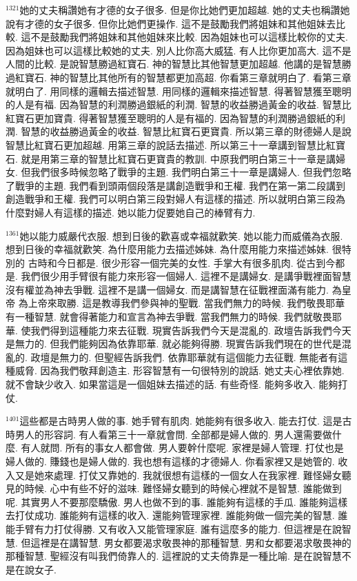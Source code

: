 \documentclass{book}
\begin{document}
$^{1321}$她的丈夫稱讚她有才德的女子很多.
但是你比她們更加超越.
她的丈夫也稱讚她說有才德的女子很多.
但你比她們更操作.
這不是鼓勵我們將姐妹和其他姐妹去比較.
這不是鼓勵我們將姐妹和其他姐妹來比較.
因為姐妹也可以這樣比較你的丈夫.
因為姐妹也可以這樣比較她的丈夫.
別人比你高大威猛.
有人比你更加高大.
這不是人間的比較.
是說智慧勝過紅寶石.
神的智慧比其他智慧更加超越.
他講的是智慧勝過紅寶石.
神的智慧比其他所有的智慧都更加高超.
你看第三章就明白了.
看第三章就明白了.
用同樣的邏輯去描述智慧.
用同樣的邏輯來描述智慧.
得著智慧獲至聰明的人是有福.
因為智慧的利潤勝過銀紙的利潤.
智慧的收益勝過黃金的收益.
智慧比紅寶石更加寶貴.
得著智慧獲至聰明的人是有福的.
因為智慧的利潤勝過銀紙的利潤.
智慧的收益勝過黃金的收益.
智慧比紅寶石更寶貴.
所以第三章的財德婦人是說智慧比紅寶石更加超越.
用第三章的說話去描述.
所以第三十一章講到智慧比紅寶石.
就是用第三章的智慧比紅寶石更寶貴的教訓.
中原我們明白第三十一章是講婦女.
但我們很多時候忽略了戰爭的主題.
我們明白第三十一章是講婦人.
但我們忽略了戰爭的主題.
我們看到頭兩個段落是講創造戰爭和王權.
我們在第一第二段講到創造戰爭和王權.
我們可以明白第三段對婦人有這樣的描述.
所以就明白第三段為什麼對婦人有這樣的描述.
她以能力促要她自己的棒臂有力.

$^{1361}$她以能力威嚴代衣服.
想到日後的歡喜或幸福就歡笑.
她以能力而威儀為衣服.
想到日後的幸福就歡笑.
為什麼用能力去描述姊妹.
為什麼用能力來描述姊妹.
很特別的 古時和今日都是.
很少形容一個完美的女性.
手掌大有很多肌肉.
從古到今都是.
我們很少用手臂很有能力來形容一個婦人.
這裡不是講婦女.
是講爭戰裡面智慧沒有權並為神去爭戰.
這裡不是講一個婦女.
而是講智慧在征戰裡面滿有能力.
為皇帝 為上帝來取勝.
這是教導我們參與神的聖戰.
當我們無力的時候.
我們敬畏耶華有一種智慧.
就會得著能力和宣言為神去爭戰.
當我們無力的時候.
我們就敬畏耶華.
使我們得到這種能力來去征戰.
現實告訴我們今天是混亂的.
政壇告訴我們今天是無力的.
但我們能夠因為依靠耶華.
就必能夠得勝.
現實告訴我們現在的世代是混亂的.
政壇是無力的.
但聖經告訴我們.
依靠耶華就有這個能力去征戰.
無能者有這種威脅.
因為我們敬拜創造主.
形容智慧有一句很特別的說話.
她丈夫心裡依靠她.
就不會缺少收入.
如果當這是一個姐妹去描述的話.
有些奇怪.
能夠多收入.
能夠打仗.

$^{1401}$這些都是古時男人做的事.
她手臂有肌肉.
她能夠有很多收入.
能去打仗.
這是古時男人的形容詞.
有人看第三十一章就會問.
全部都是婦人做的.
男人還需要做什麼.
有人就問.
所有的事女人都會做.
男人要幹什麼呢.
家裡是婦人管理.
打仗也是婦人做的.
賺錢也是婦人做的.
我也想有這樣的才德婦人.
你看家裡又是她管的.
收入又是她來處理.
打仗又靠她的.
我就很想有這樣的一個女人在我家裡.
難怪婦女聽見的時候.
心中有些不好的滋味.
難怪婦女聽到的時候心裡就不是智慧.
誰能做到呢.
其實男人不要那麼驕傲.
男人也做不到的事.
誰能夠有這樣的手瓜.
誰能夠這樣去打仗成功.
誰能夠有這樣的收入.
還能夠管理家裡.
誰能夠做一個完美的智慧.
誰能手臂有力打仗得勝.
又有收入又能管理家庭.
誰有這麼多的能力.
但這裡是在說智慧.
但這裡是在講智慧.
男女都要渴求敬畏神的那種智慧.
男和女都要渴求敬畏神的那種智慧.
聖經沒有叫我們倚靠人的.
這裡說的丈夫倚靠是一種比喻.
是在說智慧不是在說女子.
\end{document}
